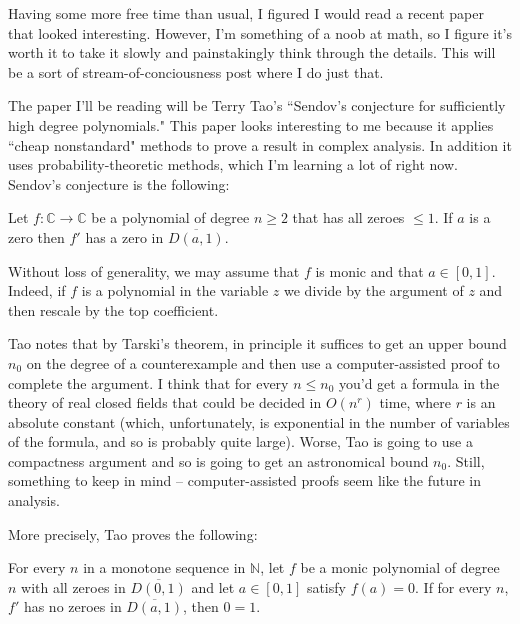 \documentclass[12pt]{article}
\newcommand{\NN}{\mathbb{N}}
\newcommand{\CC}{\mathbb{C}}
\begin{document}

Having some more free time than usual, I figured I would read a recent paper that looked interesting.
However, I'm something of a noob at math, so I figure it's worth it to take it slowly and painstakingly think through the details.
This will be a sort of stream-of-conciousness post where I do just that.

The paper I'll be reading will be Terry Tao's ``Sendov's conjecture for sufficiently high degree polynomials."
This paper looks interesting to me because it applies ``cheap nonstandard" methods to prove a result in complex analysis.
In addition it uses probability-theoretic methods, which I'm learning a lot of right now.
Sendov's conjecture is the following:

\begin{conjecture}
Let $f: \CC \to \CC$ be a polynomial of degree $n \geq 2$ that has all zeroes $\leq 1$. If $a$ is a zero then $f'$ has a zero in $\overline{D(a, 1)}$.
\end{conjecture}

Without loss of generality, we may assume that $f$ is monic and that $a \in [0, 1]$.
Indeed, if $f$ is a polynomial in the variable $z$ we divide by the argument of $z$ and then rescale by the top coefficient.

Tao notes that by Tarski's theorem, in principle it suffices to get an upper bound $n_0$ on the degree of a counterexample and then use a computer-assisted proof to complete the argument.
I think that for every $n \leq n_0$ you'd get a formula in the theory of real closed fields that could be decided in $O(n^r)$ time, where $r$ is an absolute constant (which, unfortunately, is exponential in the number of variables of the formula, and so is probably quite large).
Worse, Tao is going to use a compactness argument and so is going to get an astronomical bound $n_0$.
Still, something to keep in mind -- computer-assisted proofs seem like the future in analysis.

More precisely, Tao proves the following:

\begin{proposition}
\label{main proposition}
For every $n$ in a monotone sequence in $\NN$, let $f$ be a monic polynomial of degree $n$ with all zeroes in $\overline{D(0, 1)}$ and let $a \in [0, 1]$ satisfy $f(a) = 0$.
If for every $n$, $f'$ has no zeroes in $\overline{D(a, 1)}$, then $0 = 1$.
\end{proposition}
\end{document}
